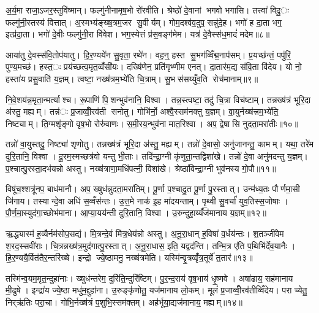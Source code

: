 अ॒र्य॒मा राजा॒ऽजर॒स्तुवि॑ष्मान्। फल्गु॑नीनामृष॒भो रो॑रवीति। श्रेष्ठो॑ दे॒वानां भगवो भगासि। तत्त्वा॑ विदु॒ः फल्गु॑नी॒स्तस्य॑ वित्तात्। अ॒स्मभ्य॑ङ्ख्ष॒त्रम॒जर सु॒वीर्यम्। गोम॒दश्व॑व॒दुप॒ सन्नु॑दे॒ह। भगो॑ ह दा॒ता भग॒ इत्प्र॑दा॒ता। भगो॑ दे॒वीः फल्गु॑नी॒रा वि॑वेश। भग॒स्येत्तं प्र॑स॒वङ्ग॑मेम। यत्र॑ दे॒वैस्स॑ध॒मादं॑ मदेम॥८॥

आया॑तु दे॒वस्स॑वि॒तोप॑यातु। हि॒र॒ण्यये॑न सु॒वृता॒ रथे॑न। वह॒न्॒ हस्त सु॒भग॑व्विँद्म॒नाप॑सम्। प्र॒यच्छ॑न्तं॒ पपु॑रिं॒ पुण्य॒मच्छ॑। हस्त॒ः प्रय॑च्छत्व॒मृत॒व्वँसी॑यः। दख्षि॑णेन॒ प्रति॑गृभ्णीम एनत्। दा॒तार॑म॒द्य स॑वि॒ता वि॑देय। यो नो॒ हस्ता॑य प्रसु॒वाति॑ य॒ज्ञम्। त्वष्टा॒ नख्ष॑त्रम॒भ्ये॑ति चि॒त्राम्। सु॒भस॑सय्युँव॒ति रोच॑मानाम्॥९॥

नि॒वे॒शय॑न्न॒मृता॒न्मर्त्याश्च। रू॒पाणि॑ पि॒शन्भुव॑नानि॒ विश्वा। तन्न॒स्त्वष्टा॒ तदु॑ चि॒त्रा विच॑ष्टाम्। तन्नख्ष॑त्रं भूरि॒दा अ॑स्तु॒ मह्यम्। तन्न॑ः प्र॒जाव्वीँ॒रव॑ती सनोतु। गोभि॑र्नो॒ अश्वै॒स्सम॑नक्तु य॒ज्ञम्। वा॒युर्नख्ष॑त्त्रम॒भ्ये॑ति॒ निष्ट्याम्। ति॒ग्मशृ॑ङ्गो वृष॒भो रोरु॑वाणः। स॒मी॒रय॒न्भुव॑ना मात॒रिश्वा। अप॒ द्वेषासि नुदता॒मरा॑तीः॥१०॥

तन्नो॑ वा॒युस्तदु॒ निष्ट्या॑ शृणोतु। तन्नख्ष॑त्रं भूरि॒दा अ॑स्तु॒ मह्यम्। तन्नो॑ दे॒वासो॒ अनु॑जानन्तु॒ कामम्। यथा॒ तरे॑म दुरि॒तानि॒ विश्वा। दू॒रम॒स्मच्छत्र॑वो यन्तु भी॒ताः। तदि॑न्द्रा॒ग्नी कृ॑णुता॒न्तद्विशा॑खे। तन्नो॑ दे॒वा अनु॑मदन्तु य॒ज्ञम्। प॒श्चात्पु॒रस्ता॒दभ॑यन्नो अस्तु। नख्ष॑त्राणा॒मधि॑पत्नी॒ विशा॑खे। श्रेष्ठा॑विन्द्रा॒ग्नी भुव॑नस्य गो॒पौ॥११॥

विषू॑च॒श्शत्रू॑नप॒ बाध॑मानौ। अप॒ ख्षुध॑न्नुदता॒मरा॑तिम्। पू॒र्णा प॒श्चादु॒त पू॒र्णा पु॒रस्तात्। उन्म॑ध्य॒तः पौर्णमा॒सी जि॑गाय। तस्यान्दे॒वा अधि॑ स॒व्वँस॑न्तः। उ॒त्त॒मे नाक॑ इ॒ह मा॑दयन्ताम्। पृ॒थ्वी सु॒वर्चा॑ युव॒तिस्स॒जोषाः। पौ॒र्ण॒मा॒स्युद॑गा॒च्छोभ॑माना। आ॒प्या॒यय॑न्ती दुरि॒तानि॒ विश्वा। उ॒रुन्दुहा॒य्यँज॑मानाय य॒ज्ञम्॥१२॥


ऋ॒द्ध्यास्म॑ ह॒व्यैर्नम॑सोप॒सद्य॑। मि॒त्रन्दे॒वं मि॑त्र॒धेय॑न्नो अस्तु। अ॒नू॒रा॒धान् ह॒विषा॑ व॒र्धय॑न्तः। श॒तञ्जी॑वेम श॒रद॒स्सवी॑राः। चि॒त्रन्नख्ष॑त्र॒मुद॑गात्पु॒रस्तात्। अ॒नू॒रा॒धास॒ इति॒ यद्वद॑न्ति। तन्मि॒त्र ए॑ति प॒थिभि॑र्देव॒यानैः। हि॒र॒ण्ययै॒र्वित॑तैर॒न्तरि॑ख्षे। इन्द्रो ज्ये॒ष्ठामनु॒ नख्ष॑त्रमेति। यस्मि॑न्वृ॒त्रव्वृँ॑त्र॒तूर्ये॑ त॒तार॑॥१३॥

तस्मि॑न्व॒यम॒मृत॒न्दुहा॑नाः। ख्षुध॑न्तरेम॒ दुरि॑ति॒न्दुरि॑ष्टिम्। पु॒र॒न्द॒राय॑ वृष॒भाय॑ धृ॒ष्णवे। अषा॑ढाय॒ सह॑मानाय मी॒ढुषे। इन्द्रा॑य ज्ये॒ष्ठा मधु॑म॒द्दुहा॑ना। उ॒रुङ्कृ॑णोतु॒ यज॑मानाय लो॒कम्। मूलं॑ प्र॒जाव्वीँ॒रव॑तीव्विँदेय। पराच्येतु॒ निर्‌ऋ॑तिः परा॒चा। गोभि॒र्नख्ष॑त्रं प॒शुभि॒स्सम॑क्तम्। अह॑र्भूया॒द्यज॑मानाय॒ मह्यम्॥१४॥

